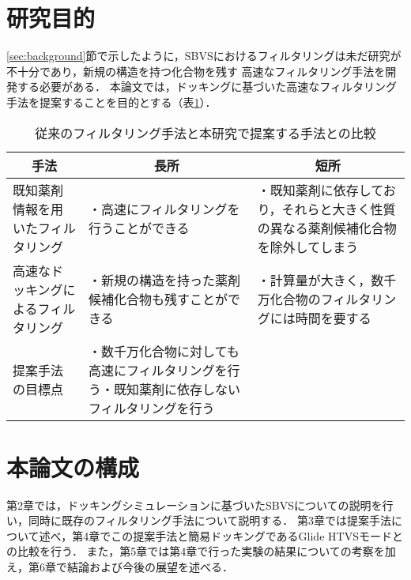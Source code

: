 \section{研究目的}
\ref{sec:background}節で示したように，SBVSにおけるフィルタリングは未だ研究が不十分であり，新規の構造を持つ化合物を残す
高速なフィルタリング手法を開発する必要がある．
本論文では，ドッキングに基づいた高速なフィルタリング手法を提案することを目的とする（表\ref{table:filtering_aim}）．

\begin{table}[t] \centering
	\caption{従来のフィルタリング手法と本研究で提案する手法との比較}
	\label{table:filtering_aim}
	\begin{tabular}{p{3.5cm}p{5cm}p{5cm}}
	\hline
	\multicolumn{1}{c}{手法}&\multicolumn{1}{c}{長所}&\multicolumn{1}{c}{短所} \\ \hline
	既知薬剤情報を用いたフィルタリング&・高速にフィルタリングを行うことができる&・既知薬剤に依存しており，それらと大きく性質の異なる薬剤候補化合物を除外してしまう \\ \hline
	高速なドッキングによるフィルタリング&・新規の構造を持った薬剤候補化合物も残すことができる	&・計算量が大きく，数千万化合物のフィルタリングには時間を要する	\\ \hline
	提案手法の目標点&・数千万化合物に対しても高速にフィルタリングを行う\hspace{5cm}・既知薬剤に依存しないフィルタリングを行う	&	\\ \hline
	\end{tabular}	
\end{table}

\section{本論文の構成}
第2章では，ドッキングシミュレーションに基づいたSBVSについての説明を行い，同時に既存のフィルタリング手法について説明する．
第3章では提案手法について述べ，第4章でこの提案手法と簡易ドッキングであるGlide HTVSモードとの比較を行う．
また，第5章では第4章で行った実験の結果についての考察を加え，第6章で結論および今後の展望を述べる．